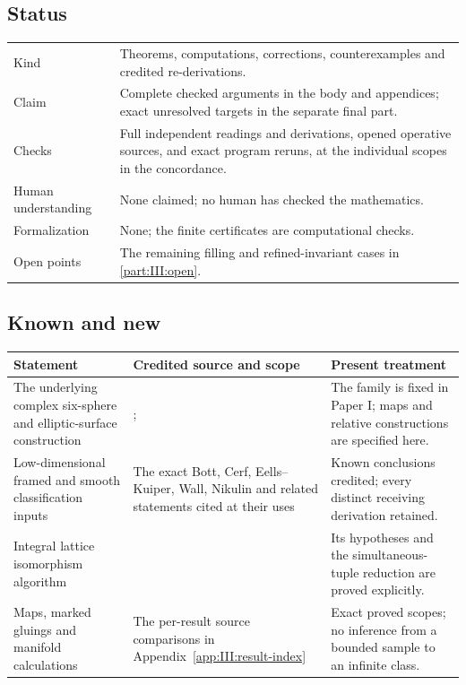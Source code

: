 \subsection*{Status}
\begin{tabular}{@{}p{31mm}p{120mm}@{}}
\toprule
Kind & Theorems, computations, corrections, counterexamples and credited re-derivations.\\
Claim & Complete checked arguments in the body and appendices; exact unresolved targets in the separate final part.\\
Checks & Full independent readings and derivations, opened operative sources, and exact program reruns, at the individual scopes in the concordance.\\
Human understanding & None claimed; no human has checked the mathematics.\\
Formalization & None; the finite certificates are computational checks.\\
Open points & The remaining filling and refined-invariant cases in \cref{part:III:open}.\\
\bottomrule
\end{tabular}

\subsection*{Known and new}
\begin{tabular}{@{}p{42mm}p{70mm}p{37mm}@{}}
\toprule
Statement & Credited source and scope & Present treatment\\\midrule
The underlying complex six-sphere and elliptic-surface construction &
\citet[Theorem~10.5]{AC2026}; \citet[main theorem]{Engel2026} &
The family is fixed in Paper I; maps and relative constructions are specified here.\\
Low-dimensional framed and smooth classification inputs &
The exact Bott, Cerf, Eells--Kuiper, Wall, Nikulin and related statements cited at their uses &
Known conclusions credited; every distinct receiving derivation retained.\\
Integral lattice isomorphism algorithm &
\citet[Theorems~3.4, 7.9, 8.4; Algorithm~8.3]{rootBHJ22} &
Its hypotheses and the simultaneous-tuple reduction are proved explicitly.\\
Maps, marked gluings and manifold calculations &
The per-result source comparisons in Appendix~\ref{app:III:result-index} &
Exact proved scopes; no inference from a bounded sample to an infinite class.\\
\bottomrule
\end{tabular}

